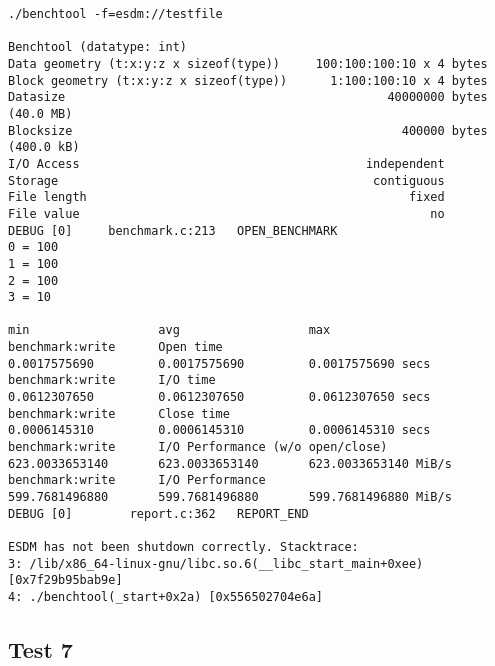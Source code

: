 \begin{verbatim}
./benchtool -f=esdm://testfile

Benchtool (datatype: int)
Data geometry (t:x:y:z x sizeof(type))     100:100:100:10 x 4 bytes
Block geometry (t:x:y:z x sizeof(type))      1:100:100:10 x 4 bytes
Datasize                                             40000000 bytes                (40.0 MB)
Blocksize                                              400000 bytes                (400.0 kB)
I/O Access                                        independent
Storage                                            contiguous
File length                                             fixed
File value                                                 no
DEBUG [0]     benchmark.c:213   OPEN_BENCHMARK
0 = 100
1 = 100
2 = 100
3 = 10
                                                                               min                  avg                  max
benchmark:write      Open time                                        0.0017575690         0.0017575690         0.0017575690 secs
benchmark:write      I/O time                                         0.0612307650         0.0612307650         0.0612307650 secs
benchmark:write      Close time                                       0.0006145310         0.0006145310         0.0006145310 secs
benchmark:write      I/O Performance (w/o open/close)               623.0033653140       623.0033653140       623.0033653140 MiB/s
benchmark:write      I/O Performance                                599.7681496880       599.7681496880       599.7681496880 MiB/s
DEBUG [0]        report.c:362   REPORT_END

ESDM has not been shutdown correctly. Stacktrace:
3: /lib/x86_64-linux-gnu/libc.so.6(__libc_start_main+0xee) [0x7f29b95bab9e]
4: ./benchtool(_start+0x2a) [0x556502704e6a]
\end{verbatim}

\subsection{Test 7}

